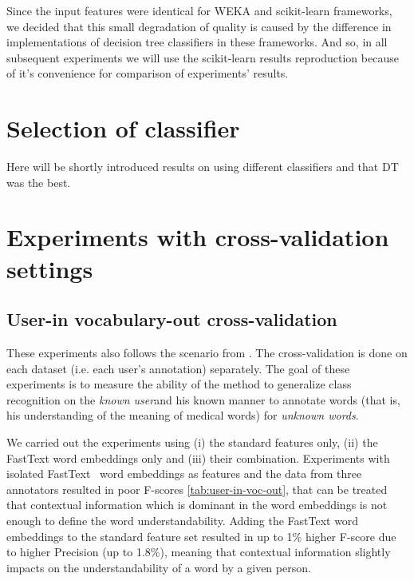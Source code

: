 Since the input features were identical for WEKA and scikit-learn frameworks, we decided that this small degradation of quality is caused by the difference in implementations of decision tree classifiers in these frameworks. And so, in all subsequent experiments we will use the scikit-learn results reproduction because of it's convenience for comparison of experiments' results. 

\section{Selection of classifier}
Here will be shortly introduced results on using different classifiers and that DT was the best.

\section{Experiments with cross-validation settings}
\subsection{User-in vocabulary-out cross-validation}

These experiments also follows the scenario from \citep{Grabar-PITR2014}. The cross-validation is done on each dataset (i.e. each user's annotation) separately. The goal of these experiments is to measure the ability of the method to generalize class recognition on the \textit{known user}and his known manner to annotate words (that is, his understanding of the meaning of medical words) for \textit{unknown words}. 

We carried out the experiments using (i) the standard features only, (ii) the FastText word embeddings only and (iii) their combination. Experiments with isolated FastText ~word embeddings as features and the data from three annotators resulted in poor F-scores \ref{tab:user-in-voc-out}, that can be treated that contextual information which is dominant in the word embeddings is not enough to define the word understandability. Adding the FastText word embeddings to the standard feature set resulted in up to 1\% higher F-score due to higher Precision (up to 1.8\%), meaning that contextual information slightly impacts on the understandability of a word by a given person.

